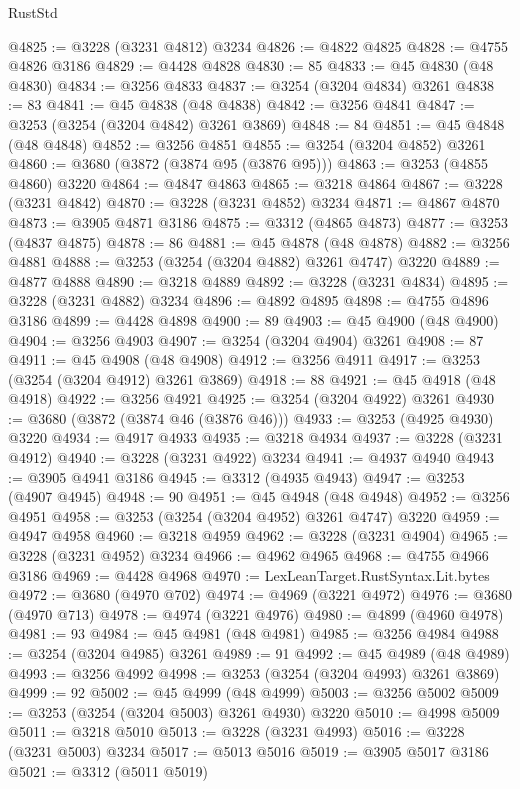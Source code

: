 \begin{lexlean}{RustStd}
\begin{coremodule}
@4825 := @3228 (@3231 @4812) @3234
@4826 := @4822 @4825
@4828 := @4755 @4826 @3186
@4829 := @4428 @4828
@4830 := 85
@4833 := @45 @4830 (@48 @4830)
@4834 := @3256 @4833
@4837 := @3254 (@3204 @4834) @3261
@4838 := 83
@4841 := @45 @4838 (@48 @4838)
@4842 := @3256 @4841
@4847 := @3253 (@3254 (@3204 @4842) @3261 @3869)
@4848 := 84
@4851 := @45 @4848 (@48 @4848)
@4852 := @3256 @4851
@4855 := @3254 (@3204 @4852) @3261
@4860 := @3680 (@3872 (@3874 @95 (@3876 @95)))
@4863 := @3253 (@4855 @4860) @3220
@4864 := @4847 @4863
@4865 := @3218 @4864
@4867 := @3228 (@3231 @4842)
@4870 := @3228 (@3231 @4852) @3234
@4871 := @4867 @4870
@4873 := @3905 @4871 @3186
@4875 := @3312 (@4865 @4873)
@4877 := @3253 (@4837 @4875)
@4878 := 86
@4881 := @45 @4878 (@48 @4878)
@4882 := @3256 @4881
@4888 := @3253 (@3254 (@3204 @4882) @3261 @4747) @3220
@4889 := @4877 @4888
@4890 := @3218 @4889
@4892 := @3228 (@3231 @4834)
@4895 := @3228 (@3231 @4882) @3234
@4896 := @4892 @4895
@4898 := @4755 @4896 @3186
@4899 := @4428 @4898
@4900 := 89
@4903 := @45 @4900 (@48 @4900)
@4904 := @3256 @4903
@4907 := @3254 (@3204 @4904) @3261
@4908 := 87
@4911 := @45 @4908 (@48 @4908)
@4912 := @3256 @4911
@4917 := @3253 (@3254 (@3204 @4912) @3261 @3869)
@4918 := 88
@4921 := @45 @4918 (@48 @4918)
@4922 := @3256 @4921
@4925 := @3254 (@3204 @4922) @3261
@4930 := @3680 (@3872 (@3874 @46 (@3876 @46)))
@4933 := @3253 (@4925 @4930) @3220
@4934 := @4917 @4933
@4935 := @3218 @4934
@4937 := @3228 (@3231 @4912)
@4940 := @3228 (@3231 @4922) @3234
@4941 := @4937 @4940
@4943 := @3905 @4941 @3186
@4945 := @3312 (@4935 @4943)
@4947 := @3253 (@4907 @4945)
@4948 := 90
@4951 := @45 @4948 (@48 @4948)
@4952 := @3256 @4951
@4958 := @3253 (@3254 (@3204 @4952) @3261 @4747) @3220
@4959 := @4947 @4958
@4960 := @3218 @4959
@4962 := @3228 (@3231 @4904)
@4965 := @3228 (@3231 @4952) @3234
@4966 := @4962 @4965
@4968 := @4755 @4966 @3186
@4969 := @4428 @4968
@4970 := LexLeanTarget.RustSyntax.Lit.bytes
@4972 := @3680 (@4970 @702)
@4974 := @4969 (@3221 @4972)
@4976 := @3680 (@4970 @713)
@4978 := @4974 (@3221 @4976)
@4980 := @4899 (@4960 @4978)
@4981 := 93
@4984 := @45 @4981 (@48 @4981)
@4985 := @3256 @4984
@4988 := @3254 (@3204 @4985) @3261
@4989 := 91
@4992 := @45 @4989 (@48 @4989)
@4993 := @3256 @4992
@4998 := @3253 (@3254 (@3204 @4993) @3261 @3869)
@4999 := 92
@5002 := @45 @4999 (@48 @4999)
@5003 := @3256 @5002
@5009 := @3253 (@3254 (@3204 @5003) @3261 @4930) @3220
@5010 := @4998 @5009
@5011 := @3218 @5010
@5013 := @3228 (@3231 @4993)
@5016 := @3228 (@3231 @5003) @3234
@5017 := @5013 @5016
@5019 := @3905 @5017 @3186
@5021 := @3312 (@5011 @5019)

\end{coremodule}
\end{lexlean}
